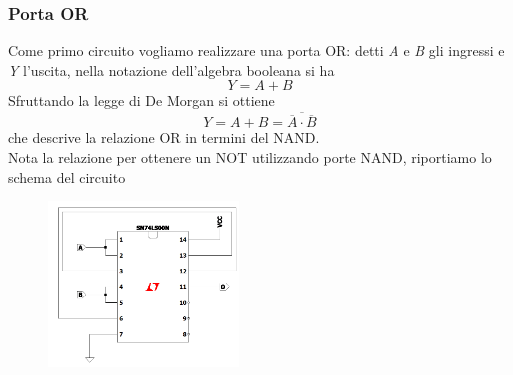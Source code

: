 \documentclass[10pt, a4paper, italian]{article}
\begin{document}
\subsubsection*{Porta OR}
Come primo circuito vogliamo realizzare una porta OR: detti \textit{A} e \textit{B} gli ingressi e \textit{Y} l'uscita, nella notazione dell'algebra booleana si ha
\[
    Y=A+B
\]
Sfruttando la legge di De Morgan si ottiene
\[
    Y=A+B=\overline{\overline{A}\cdot\overline{B}}
\]
che descrive la relazione OR in termini del NAND.\\
Nota la relazione per ottenere un NOT utilizzando porte NAND, riportiamo lo schema del circuito
\begin{figure}[htb!]
    \centering
    \includegraphics[width=0.45\textwidth]{NAND_OR.png}
    \label{or}
\end{figure}
\end{document}
